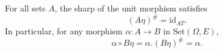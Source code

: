 For all sets $A$, the sharp of the unit morphism satisfies
$$
(A\eta)^\# = \text{id}_{AT}.
$$
In particular, for any morphism $\alpha: A \longrightarrow B$ in $\text{Set}(\Omega, E)$,
$$
\alpha \circ B\eta = \alpha.(B\eta)^\# = \alpha.
$$
